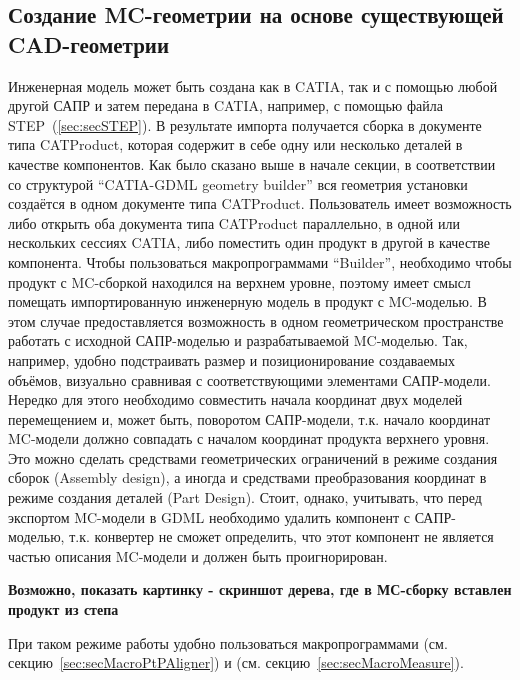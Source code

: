 \subsection{Создание MC-геометрии на основе существующей CAD-геометрии}\label{sec:secMCfromCAD}

Инженерная модель может быть создана как в CATIA, так и с помощью любой другой САПР и затем передана в CATIA, например, с помощью файла STEP~(\ref{sec:secSTEP}).
В результате импорта получается сборка в документе типа CATProduct, которая содержит в себе одну или несколько деталей в качестве компонентов.
Как было сказано выше в начале секции, в соответствии со структурой ``CATIA-GDML geometry builder'' вся геометрия установки создаётся в одном документе типа CATProduct. 
Пользователь имеет возможность либо открыть оба документа типа CATProduct параллельно, в одной или нескольких сессиях CATIA, либо поместить один продукт в другой в качестве компонента. Чтобы пользоваться макропрограммами ``Builder'', необходимо чтобы продукт с MC-сборкой находился на верхнем уровне, поэтому имеет смысл помещать импортированную инженерную модель в продукт с MC-моделью. В этом случае предоставляется возможность в одном геометрическом пространстве работать с исходной САПР-моделью и разрабатываемой MC-моделью. Так, например, удобно подстраивать размер и позиционирование создаваемых объёмов, визуально сравнивая с соответствующими элементами САПР-модели. Нередко для этого необходимо совместить начала координат двух моделей перемещением и, может быть, поворотом САПР-модели, т.к. начало координат MC-модели должно совпадать с началом координат продукта верхнего уровня. Это можно сделать средствами геометрических ограничений в режиме создания сборок (Assembly design), а иногда и средствами преобразования координат в режиме создания деталей (Part Design). Стоит, однако, учитывать, что перед экспортом MC-модели в GDML необходимо удалить компонент с САПР-моделью, т.к. конвертер  не сможет определить, что этот компонент не является частью описания MC-модели и должен быть проигнорирован.

\textbf{Возможно, показать картинку - скриншот дерева, где в МС-сборку вставлен продукт из степа}

При таком режиме работы удобно пользоваться макропрограммами  (см. секцию~\ref{sec:secMacroPtPAligner}) и  (см. секцию~\ref{sec:secMacroMeasure}).

%                                                    

